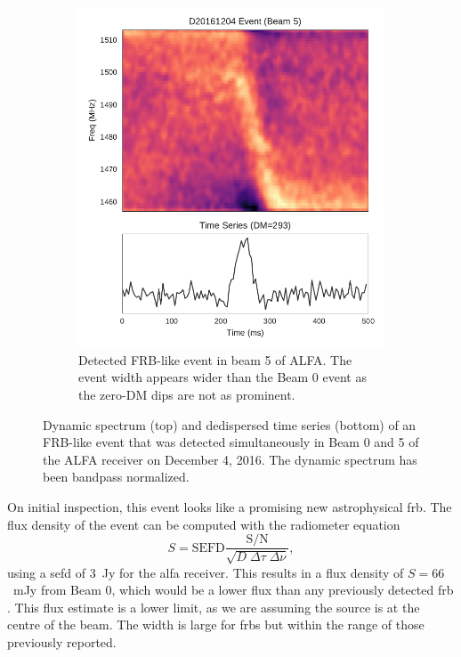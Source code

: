 \documentclass[a4paper,fleqn,usenatbib]{mnras}
\begin{document}
\begin{figure}
\begin{subfigure}[t]{0.45\textwidth}
        \includegraphics[width=1.0\textwidth]{figures/D20161204_buf4_Beam5.pdf}
        \caption{Detected FRB-like event in beam 5 of ALFA. The event width
        appears wider than the Beam 0 event as the zero-DM dips are not as
        prominent.
        }
        \label{fig:beam5_dynamic_spec}
    \end{subfigure}
    \caption{
    Dynamic spectrum (top) and dedispersed time series (bottom) of an FRB-like
    event that was detected simultaneously in Beam 0 and 5 of the ALFA receiver
    on December 4, 2016. The dynamic spectrum has been bandpass normalized.
    }
    \label{fig:dynamic_spec}
\end{figure}

On initial inspection, this event looks like a promising new astrophysical
\gls{frb}. The flux density of the event can be computed with the radiometer
equation
%
$$
S = \textrm{SEFD} \frac{\textrm{S/N}}{\sqrt{D \; \Delta \tau \;
\Delta \nu}},
$$
%
using a \gls{sefd} of 3~Jy for the \gls{alfa} receiver. This results in a flux
density of $S = 66$~mJy from Beam 0, which would be a lower flux than any
previously detected \gls{frb} \citep{2016PASA...33...45P}. This flux estimate is
a lower limit, as we are assuming the source is at the centre of the beam. The
width is large for \glspl{frb} but within the range of those previously
reported.
\end{document}
